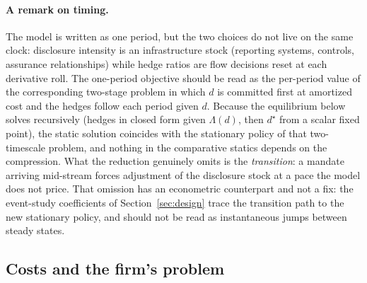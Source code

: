 \documentclass[11pt,a4paper]{article}
\begin{document}
\paragraph{A remark on timing.}
The model is written as one period, but the two choices do not live on the same clock: disclosure intensity is an infrastructure stock (reporting systems, controls, assurance relationships) while hedge ratios are flow decisions reset at each derivative roll. The one-period objective should be read as the per-period value of the corresponding two-stage problem in which $d$ is committed first at amortized cost and the hedges follow each period given $d$. Because the equilibrium below solves recursively (hedges in closed form given $\Lambda(d)$, then $d^\star$ from a scalar fixed point), the static solution coincides with the stationary policy of that two-timescale problem, and nothing in the comparative statics depends on the compression. What the reduction genuinely omits is the \emph{transition}: a mandate arriving mid-stream forces adjustment of the disclosure stock at a pace the model does not price. That omission has an econometric counterpart and not a fix: the event-study coefficients of Section~\ref{sec:design} trace the transition path to the new stationary policy, and should not be read as instantaneous jumps between steady states.

\subsection{Costs and the firm's problem}
\label{sec:problem}
\end{document}
